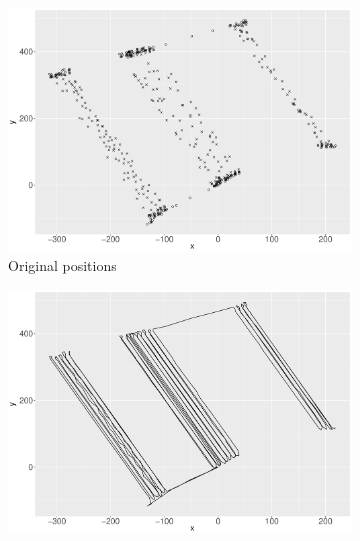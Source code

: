 
\begin{figure}
\centering
    \begin{subfigure}{0.45\textwidth}
    \centering
    \includegraphics[width=\textwidth]{Chapters/02TractorSplineTheory/plot/ggplot/gg512Points.pdf}
    \caption{Original positions}\label{gg512Points}
    \end{subfigure}%
    \begin{subfigure}{0.45\textwidth}
    \centering
    \includegraphics[width=\textwidth]{Chapters/02TractorSplineTheory/plot/ggplot/gg512Path.pdf}

\end{subfigure}
\end{figure}
